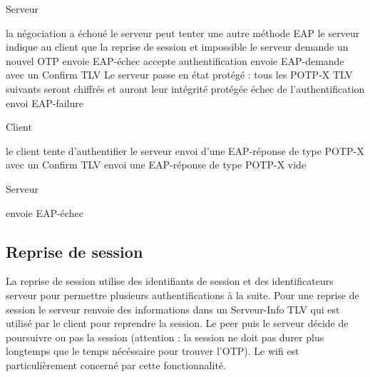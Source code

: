 \documentclass{article}
\begin{document}
\begin{flushleft}
\begin{algorithm}[!h]
	\caption{Serveur}
	\label{POTP:verif}
\begin{algorithmic}
	\STATE la négociation a échoué
	\STATE le serveur peut tenter une autre méthode EAP
\ENDIF
{}
	\STATE le serveur indique au client que la reprise de session et impossible
	\STATE le serveur demande un nouvel OTP
\ENDIF
{}
	\STATE envoie EAP-échec
\ENDIF
{}
	\STATE accepte authentification
	\STATE envoie EAP-demande avec un Confirm TLV
		\STATE Le serveur passe en état protégé : tous les POTP-X TLV suivants seront chiffrés et auront leur intégrité protégée
	\ENDIF
\ELSE
	\STATE échec de l'authentification
	\STATE envoi EAP-failure
\ENDIF

\end{algorithmic}
\end{algorithm}
\end{flushleft}



\begin{flushright}
\begin{algorithm}[!h]
	\caption{Client}
	\label{POTP:verif}
\begin{algorithmic}
	\STATE le client tente d'authentifier le serveur
		\STATE envoi d'une EAP-réponse de type POTP-X avec un Confirm TLV
	\ELSE
		\STATE envoi une EAP-réponse de type POTP-X vide
	\ENDIF
\ENDIF

\end{algorithmic}
\end{algorithm}
\end{flushright}


\begin{flushleft}
\begin{algorithm}[!h]
	\caption{Serveur}
	\label{POTP:verif}
\begin{algorithmic}
	\STATE envoie EAP-échec
\ENDIF

\end{algorithmic}
\end{algorithm}
\end{flushleft}


\subsection{Reprise de session}
La reprise de session utilise des identifiants de session et des identificateurs serveur pour permettre plusieurs authentifications à la suite.
Pour une reprise de session le serveur renvoie des informations dans un Serveur-Info TLV qui est utilisé par le client pour reprendre la session.
Le peer puis le serveur décide de poursuivre ou pas la session (attention : la session ne doit pas durer plus longtemps que le temps nécéssaire pour trouver l'OTP).
Le wifi est particulièrement concerné par cette fonctionnalité.
\end{document}
